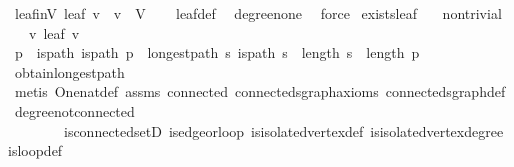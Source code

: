 \begin{isabellebody}
\endisatagproof
{\isafoldproof}%
%
\isadelimproof
\isanewline
%
\endisadelimproof
\isanewline
{}\isamarkupfalse%
\ leaf{\isacharunderscore}{\kern0pt}in{\isacharunderscore}{\kern0pt}V{\isacharcolon}{\kern0pt}\ {\isachardoublequoteopen}leaf\ v\ {\isasymLongrightarrow}\ v\ {\isasymin}\ V{\isachardoublequoteclose}\isanewline
%
\isadelimproof
\ \ %
\endisadelimproof
%
\isatagproof
{}\isamarkupfalse%
\ leaf{\isacharunderscore}{\kern0pt}def\ \isamarkupfalse%
\ degree{\isacharunderscore}{\kern0pt}none\ \isamarkupfalse%
\ force%
\endisatagproof
{\isafoldproof}%
%
\isadelimproof
\isanewline
%
\endisadelimproof
\isanewline
{}\isamarkupfalse%
\ exists{\isacharunderscore}{\kern0pt}leaf{\isacharcolon}{\kern0pt}\isanewline
\ \ \ {\isachardoublequoteopen}non{\isacharunderscore}{\kern0pt}trivial{\isachardoublequoteclose}\isanewline
\ \ \ {\isachardoublequoteopen}{\isasymexists}v{\isachardot}{\kern0pt}\ leaf\ v{\isachardoublequoteclose}\isanewline
%
\isadelimproof
%
\endisadelimproof
%
\isatagproof
{}\isamarkupfalse%
{\isacharminus}{\kern0pt}\isanewline
\ \ \isamarkupfalse%
\ p\ \ is{\isacharunderscore}{\kern0pt}path{\isacharcolon}{\kern0pt}\ {\isachardoublequoteopen}is{\isacharunderscore}{\kern0pt}path\ p{\isachardoublequoteclose}\ \ longest{\isacharunderscore}{\kern0pt}path{\isacharcolon}{\kern0pt}\ {\isachardoublequoteopen}{\isasymforall}s{\isachardot}{\kern0pt}\ is{\isacharunderscore}{\kern0pt}path\ s\ {\isasymlongrightarrow}\ length\ s\ {\isasymle}\ length\ p{\isachardoublequoteclose}\isanewline
\ \ \ \ \isamarkupfalse%
\ obtain{\isacharunderscore}{\kern0pt}longest{\isacharunderscore}{\kern0pt}path\ \isanewline
\ \ \ \ \isamarkupfalse%
\ {\isacharparenleft}{\kern0pt}metis\ One{\isacharunderscore}{\kern0pt}nat{\isacharunderscore}{\kern0pt}def\ assms\ connected\ connected{\isacharunderscore}{\kern0pt}sgraph{\isacharunderscore}{\kern0pt}axioms\ connected{\isacharunderscore}{\kern0pt}sgraph{\isacharunderscore}{\kern0pt}def\ degree{\isacharunderscore}{\kern0pt}{}{\isacharunderscore}{\kern0pt}not{\isacharunderscore}{\kern0pt}connected\isanewline
\ \ \ \ \ \ \ \ is{\isacharunderscore}{\kern0pt}connected{\isacharunderscore}{\kern0pt}setD\ is{\isacharunderscore}{\kern0pt}edge{\isacharunderscore}{\kern0pt}or{\isacharunderscore}{\kern0pt}loop\ is{\isacharunderscore}{\kern0pt}isolated{\isacharunderscore}{\kern0pt}vertex{\isacharunderscore}{\kern0pt}def\ is{\isacharunderscore}{\kern0pt}isolated{\isacharunderscore}{\kern0pt}vertex{\isacharunderscore}{\kern0pt}degree{}\ is{\isacharunderscore}{\kern0pt}loop{\isacharunderscore}{\kern0pt}def\isanewline

\end{isabellebody}
